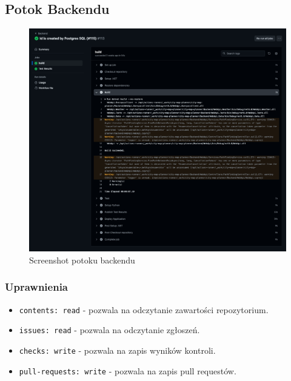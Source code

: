 \subsection{Potok Backendu}
\label{subsec:potok-backendu}

\begin{figure}[H]
    \centering
    \includegraphics[width=1\textwidth]{attachments/backend-ci}
    \caption{Screenshot potoku backendu}
\end{figure}

\subsubsection*{Uprawnienia}
\begin{itemize}
    \item \texttt{\textcolor{codeblue}{contents: read}} - pozwala na odczytanie zawartości repozytorium.
    \item \texttt{\textcolor{codeblue}{issues: read}} - pozwala na odczytanie zgłoszeń.
    \item \texttt{\textcolor{codeblue}{checks: write}} - pozwala na zapis wyników kontroli.
    \item \texttt{\textcolor{codeblue}{pull-requests: write}} - pozwala na zapis pull requestów.
\end{itemize}

